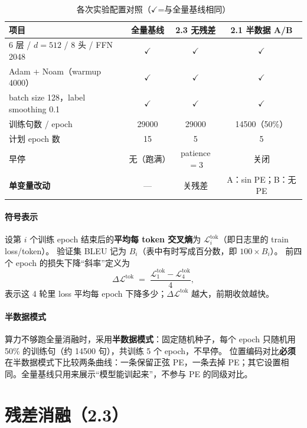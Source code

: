 \documentclass[UTF8,a4paper,11pt]{ctexart}
\newcommand{\Lt}{\mathcal{L}^{\mathrm{tok}}}
\newcommand{\Lti}[1]{\Lt_{#1}}
\newcommand{\slope}{\Delta\Lt}
\begin{document}
\begin{table}[htbp]
  \centering
  \caption{各次实验配置对照（$\checkmark$=与全量基线相同）}
  \label{tab:config}
  \small
  \begin{tabular}{lccc}
    \toprule
    项目 & 全量基线 & 2.3 无残差 & 2.1 半数据 A/B \\
    \midrule
    6 层 / $d{=}512$ / 8 头 / FFN 2048 & $\checkmark$ & $\checkmark$ & $\checkmark$ \\
    Adam + Noam（warmup 4000）& $\checkmark$ & $\checkmark$ & $\checkmark$ \\
    batch size 128，label smoothing 0.1 & $\checkmark$ & $\checkmark$ & $\checkmark$ \\
    训练句数 / epoch & 29000 & 29000 & 14500（50\%） \\
    计划 epoch 数 & 15 & 5 & 5 \\
    早停 & 无（跑满） & patience$=3$ & 关闭 \\
  \midrule
    \textbf{单变量改动} & --- & 关残差 & A：sin PE；B：无 PE \\
    \bottomrule
  \end{tabular}
\end{table}

\paragraph{符号表示}
设第 $i$ 个训练 epoch 结束后的\textbf{平均每 token 交叉熵}为 $\Lti{i}$（即日志里的 train loss/token）。
验证集 BLEU 记为 $B_i$（表中有时写成百分数，即 $100\times B_i$）。
前四个 epoch 的损失下降“斜率”定义为
\begin{equation}
  \slope \;=\; \frac{\Lti{1}-\Lti{4}}{4},
  \label{eq:slope}
\end{equation}
表示这 4 轮里 loss 平均每 epoch 下降多少；$\slope$ 越大，前期收敛越快。

\paragraph{半数据模式}
算力不够跑全量消融时，采用\textbf{半数据模式}：固定随机种子，每个 epoch 只随机用 50\% 的训练句（约 14500 句），共训练 5 个 epoch，不早停。
位置编码对比\textbf{必须}在半数据模式下比较两条曲线：一条保留正弦 PE，一条去掉 PE；其它设置相同。全量基线只用来展示“模型能训起来”，不参与 PE 的同级对比。

\section{残差消融（2.3）}
\end{document}
